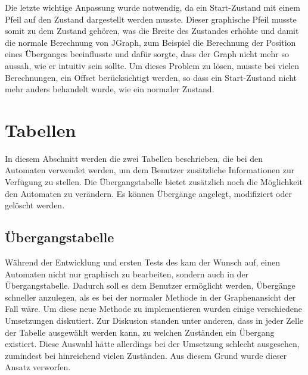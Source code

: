 Die letzte wichtige Anpassung wurde notwendig, da ein Start-Zustand mit einem
Pfeil auf den Zustand dargestellt werden musste. Dieser graphische Pfeil musste
somit zu dem Zustand gehören, was die Breite des Zustandes erhöhte und damit
die normale Berechnung von JGraph, zum Beispiel die Berechnung der Position
eines Überganges beeinflusste und dafür sorgte, dass der Graph nicht mehr so
aussah, wie er intuitiv sein sollte. Um dieses Problem zu lösen, musste bei
vielen Berechnungen, ein Offset berücksichtigt werden, so dass ein
Start-Zustand nicht mehr anders behandelt wurde, wie ein normaler
Zustand.\vspace{10pt}


\section{Tabellen}

In diesem Abschnitt werden die zwei Tabellen beschrieben, die bei den Automaten
verwendet werden, um dem Benutzer zusätzliche Informationen zur Verfügung zu
stellen. Die Übergangstabelle bietet zusätzlich noch die Möglichkeit den
Automaten zu verändern. Es können Übergänge angelegt, modifiziert oder gelöscht
werden.\vspace{10pt}


\subsection{Übergangstabelle}

Während der Entwicklung und ersten Tests des \gtitools kam der Wunsch auf,
einen Automaten nicht nur graphisch zu bearbeiten, sondern auch in der
Übergangstabelle. Dadurch soll es dem Benutzer ermöglicht werden, Übergänge
schneller anzulegen, als es bei der normaler Methode in der Graphenansicht der
Fall wäre. Um diese neue Methode zu implementieren wurden einige verschiedene
Umsetzungen diskutiert. Zur Diskusion standen unter anderen, dass in jeder
Zelle der Tabelle ausgewählt werden kann, zu welchen Zuständen ein Übergang
existiert. Diese Auswahl hätte allerdings bei der Umsetzung schlecht
ausgesehen, zumindest bei hinreichend vielen Zuständen. Aus diesem Grund wurde
dieser Ansatz verworfen.\vspace{10pt}

